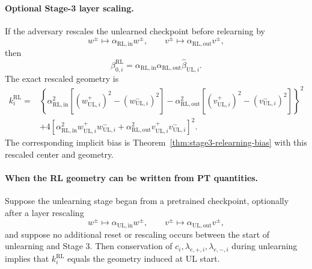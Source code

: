 \documentclass[11pt]{article}
\begin{document}
\paragraph{Optional Stage-3 layer scaling.}
If the adversary rescales the unlearned checkpoint before relearning by
\begin{equation}
    w^\pm\mapsto \alpha_{\mathrm{RL,in}}w^\pm,
    \qquad
    v^\pm\mapsto \alpha_{\mathrm{RL,out}}v^\pm,
\end{equation}
then
\begin{equation}
    \boxed{
    \beta_{0,i}^{\mathrm{RL}}
    =
    \alpha_{\mathrm{RL,in}}\alpha_{\mathrm{RL,out}}
    \widehat\beta_{\mathrm{UL},i}.
    }
\end{equation}
The exact rescaled geometry is
\begin{equation}
    \boxed{
    \begin{aligned}
    k_i^{\mathrm{RL}}
    =
    &\left\{
    \alpha_{\mathrm{RL,in}}^2
    \left[
    (w_{\mathrm{UL},i}^{+})^2
    -
    (w_{\mathrm{UL},i}^{-})^2
    \right]
    -
    \alpha_{\mathrm{RL,out}}^2
    \left[
    (v_{\mathrm{UL},i}^{+})^2
    -
    (v_{\mathrm{UL},i}^{-})^2
    \right]
    \right\}^2 \\
    &+
    4
    \left[
    \alpha_{\mathrm{RL,in}}^2
    w_{\mathrm{UL},i}^{+}w_{\mathrm{UL},i}^{-}
    +
    \alpha_{\mathrm{RL,out}}^2
    v_{\mathrm{UL},i}^{+}v_{\mathrm{UL},i}^{-}
    \right]^2 .
    \end{aligned}
    }
\end{equation}
The corresponding implicit bias is Theorem~\ref{thm:stage3-relearning-bias} with this rescaled center and geometry.

\paragraph{When the RL geometry can be written from PT quantities.}
Suppose the unlearning stage began from a pretrained checkpoint, optionally after a layer rescaling
\begin{equation}
    w^\pm\mapsto \alpha_{\mathrm{UL,in}}w^\pm,
    \qquad
    v^\pm\mapsto \alpha_{\mathrm{UL,out}}v^\pm,
\end{equation}
and suppose no additional reset or rescaling occurs between the start of unlearning and Stage 3. Then conservation of \(c_i,\lambda_{e,+,i},\lambda_{e,-,i}\) during unlearning implies that \(k_i^{\mathrm{RL}}\) equals the geometry induced at UL start.
\end{document}
